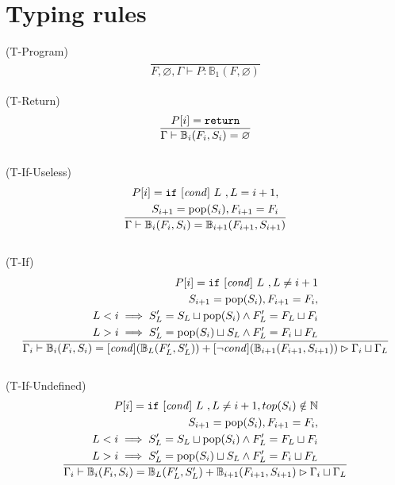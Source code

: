 \documentclass{amsart}
\newcommand{\N}{\mathbb{N}}
\newcommand{\bB}{\mathbb{B}}
\renewcommand{\emptyset}{\varnothing}
\numberwithin{equation}{section}
\theoremstyle{plain} %
\theoremstyle{definition}
\theoremstyle{remark}
\begin{document}
\section{Typing rules}
(T-Program)
\begin{equation*}
\frac{}
{F,\emptyset, \Gamma \vdash P: \bB{}_1(F, \emptyset)}
\end{equation*}
\\
(T-Return)
\begin{equation*}
\frac{P[i] = \text{\texttt{return}}}
{\Gamma \vdash \bB{}_i(F_i, S_i) = \emptyset}
\end{equation*}
\\
(T-If-Useless)
\begin{equation*}
\frac{\begin{aligned}
P[i] = \text{\texttt{if} $[\text{\textit{cond}}]$ $L$ }, L = i+1,\\
S_{i+1} = \text{pop}(S_i), F_{i+1} = F_i
\end{aligned}}
{\Gamma \vdash \bB{}_i(F_i, S_i) = \bB{}_{i+1}(F_{i+1}, S_{i+1})}
\end{equation*}
\\
(T-If)
\begin{equation*}\frac{\begin{aligned}
P[i] = \text{\texttt{if} $[\text{\textit{cond}}]$ $L$ }, L \neq i+1\\
S_{i+1} = \text{pop}(S_i), F_{i+1} = F_i,\\
L < i \implies S'_{L} = S_L \sqcup \text{pop}(S_i) \wedge F'_{L} = F_L \sqcup F_i\\
L > i \implies S'_{L} =  \text{pop}(S_i) \sqcup S_L \wedge F'_{L} = F_i \sqcup F_L
\end{aligned}}
{\Gamma_i \vdash \bB{}_i(F_i, S_i) = [\text{\textit{cond}}] (\bB{}_{L}(F'_{L}, S'_{L})) +
 [\neg \text{\textit{cond}}] (\bB{}_{i+1}(F_{i+1}, S_{i+1})) \rhd \Gamma_i \sqcup \Gamma_L }
\end{equation*}
\\
(T-If-Undefined)
\begin{equation*}\frac{\begin{aligned}
P[i] = \text{\texttt{if} $[\text{\textit{cond}}]$ $L$ }, L \neq i+1, top(S_i) \notin \N{}\\
S_{i+1} = \text{pop}(S_i), F_{i+1} = F_i,\\
L < i \implies S'_{L} = S_L \sqcup \text{pop}(S_i) \wedge F'_{L} = F_L \sqcup F_i\\
L > i \implies S'_{L} =  \text{pop}(S_i) \sqcup S_L \wedge F'_{L} = F_i \sqcup F_L
\end{aligned}}
{\Gamma_i \vdash \bB{}_i(F_i, S_i) = \bB{}_{L}(F'_{L}, S'_{L}) + \bB{}_{i+1}(F_{i+1}, S_{i+1}) \rhd \Gamma_i \sqcup \Gamma_L }
\end{equation*}
\end{document}
